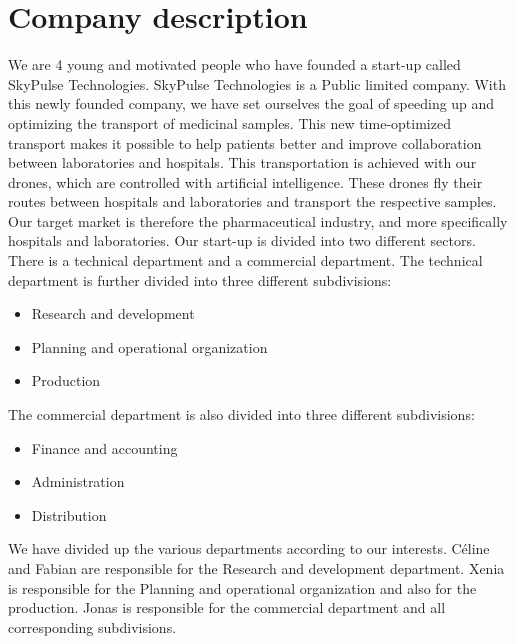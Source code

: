 \chapter{Company description} \label{description}
We are 4 young and motivated people who have founded a start-up called SkyPulse Technologies. SkyPulse Technologies is a Public limited company. With this newly founded company, we have set ourselves the goal of speeding up and optimizing the transport of medicinal samples. This new time-optimized transport makes it possible to help patients better and improve collaboration between laboratories and hospitals. This transportation is achieved with our drones, which are controlled with artificial intelligence. These drones fly their routes between hospitals and laboratories and transport the respective samples.
\newline
Our target market is therefore the pharmaceutical industry, and more specifically hospitals and laboratories.
\newline
Our start-up is divided into two different sectors. There is a technical department and a commercial department. The technical department is further divided into three different subdivisions:
\begin{itemize}
  \item Research and development
  \item Planning and operational organization
  \item Production
\end{itemize}
The commercial department is also divided into three different subdivisions:
\begin{itemize}
  \item Finance and accounting
  \item Administration
  \item Distribution
\end{itemize}
We have divided up the various departments according to our interests. Céline and Fabian are responsible for the Research and development department. Xenia is responsible for the Planning and operational organization and also for the production. Jonas is responsible for the commercial department and all corresponding subdivisions.